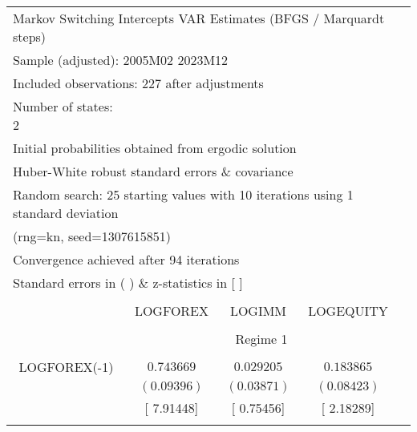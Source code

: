 \begin{tabular}{lrrrr}
\multicolumn{5}{l}{Markov Switching Intercepts VAR Estimates (BFGS / Marquardt steps)}\\
\multicolumn{3}{l}{Sample (adjusted): 2005M02 2023M12}&\multicolumn{1}{c}{}&\multicolumn{1}{c}{}\\
\multicolumn{3}{l}{Included observations: 227 after adjustments}&\multicolumn{1}{c}{}&\multicolumn{1}{c}{}\\
\multicolumn{1}{l}{Number of states: 2}&\multicolumn{1}{c}{}&\multicolumn{1}{c}{}&\multicolumn{1}{c}{}&\multicolumn{1}{c}{}\\
\multicolumn{4}{l}{Initial probabilities obtained from ergodic solution}&\multicolumn{1}{c}{}\\
\multicolumn{4}{l}{Huber-White robust standard errors \& covariance}&\multicolumn{1}{c}{}\\
\multicolumn{6}{l}{Random search: 25 starting values with 10 iterations using 1 standard deviation}\\
\multicolumn{2}{l}{(rng=kn, seed=1307615851)}&\multicolumn{1}{c}{}&\multicolumn{1}{c}{}&\multicolumn{1}{c}{}\\
\multicolumn{3}{l}{Convergence achieved after 94 iterations}&\multicolumn{1}{c}{}&\multicolumn{1}{c}{}\\
\multicolumn{3}{l}{Standard errors in ( ) \& z-statistics in [ ]}&\multicolumn{1}{c}{}&\multicolumn{1}{c}{}\\
[4.5pt] \hline \\ [-4.5pt]
\multicolumn{1}{c}{}&\multicolumn{1}{c}{LOGFOREX}&\multicolumn{1}{c}{LOGIMM}&\multicolumn{1}{c}{LOGEQUITY}&\multicolumn{1}{c}{}\\
[4.5pt] \hline \\ [-4.5pt]
\multicolumn{1}{c}{}&\multicolumn{3}{c}{Regime 1}&\multicolumn{1}{c}{}\\
[4.5pt] \hline \\ [-4.5pt]
\multicolumn{1}{c}{LOGFOREX(-1)}&\multicolumn{1}{c}{$0.743669$}&\multicolumn{1}{c}{$0.029205$}&\multicolumn{1}{c}{$0.183865$}&\multicolumn{1}{c}{}\\
\multicolumn{1}{c}{}&\multicolumn{1}{c}{$(0.09396)$}&\multicolumn{1}{c}{$(0.03871)$}&\multicolumn{1}{c}{$(0.08423)$}&\multicolumn{1}{c}{}\\
\multicolumn{1}{c}{}&\multicolumn{1}{c}{[ 7.91448]}&\multicolumn{1}{c}{[ 0.75456]}&\multicolumn{1}{c}{[ 2.18289]}&\multicolumn{1}{c}{}\\
\multicolumn{1}{c}{}&\multicolumn{1}{c}{}&\multicolumn{1}{c}{}&\multicolumn{1}{c}{}&\multicolumn{1}{c}{}\\

\end{tabular}
